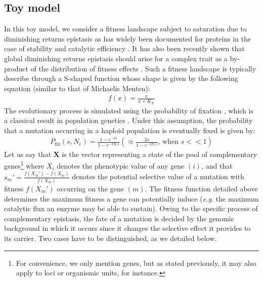 \documentclass[11pt,onecolumn]{article}
\newcommand{\vect}[1]{\boldsymbol{#1}}
\begin{document}
\subsection{Toy model}

In this toy model, we consider a fitness landscape subject to saturation due to diminishing returns epistasis \citep{Tokuriki12,Kaltenbach14} as has widely been documented for proteins in the case of stability \citep{Taverna02,Bloom05,Bloom06,Kaltenbach14} and catalytic efficiency \citep{Dykhuizen87,Hartl85,Yi19,Labourel20}. It has also been recently shown that global diminishing returns epistasis \citep{Kryazhimskiy14,Bahcall14,Otwinowski18} should arise for a complex trait as a by-product of the distribution of fitness effects \citep{Reddy20}. Such a fitness landscape is typically describe through a S-shaped function whose shape is given by the following equation (similar to that of Michaelis Menten):
\begin{align}
    f(x)=\frac{x}{x+K_X}
    \label{eq_sat}
\end{align}The evolutionary process is simulated using the probability of fixation \citep{McCandlish14}, which is a classical result in population genetics \citep{Haldane27,Kimura62,Wright31}. Under this assumption, the probability that a mutation occurring in a haploid population is eventually fixed is given by:
\begin{align}
    P_{\text{fix}}(s,N_e)=\frac{1-e^{-2s}}{1-e^{-2N_es}}(\approx \frac{2s}{1-e^{-2N_es}} \text{, when $s<<1$})
\end{align}
 Let us say that $\vect{X}$ is the vector representing a state of the pool of complementary genes\footnote{For convenience, we only mention genes, but as stated previously, it may also apply to loci or organismic units, for instance.} where  $X_i$ denotes the phenotypic value of any gene $(i)$, and that $s_m'=\frac{f(X_m')-f(X_m)}{f(X_m)}$ denotes the potential selective value of a mutation with fitness $f(X_m')$ occurring on the gene $(m)$. The fitness function detailed above determines the maximum fitness a gene can potentially induce (\textit{e.g.} the maximum catalytic flux an enzyme may be able to sustain). Owing to the specific process of complementary epistasis, the fate of a mutation is decided by the genomic background in which it occurs since it changes the selective effect it provides to its carrier. Two cases have to be distinguished, as we detailed below.
 
\end{document}
